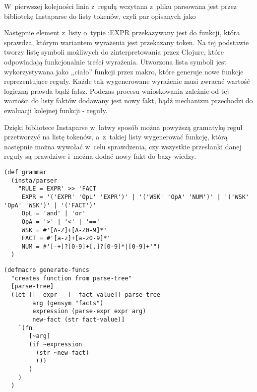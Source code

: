 W~pierwszej kolejności linia z~regułą wczytana z~pliku parsowana jest przez bibliotekę Instaparse\cite{instaparse} do listy tokenów, czyli par opisanych jako
\begin{figure}[h]
\end{figure}

Następnie element z~listy o~typie :EXPR przekazywany jest do funkcji, która sprawdza, którym wariantem wyrażenia jest przekazany token. Na tej podstawie tworzy listę symboli możliwych do zinterpretowania przez Clojure, które odpowiadają funkcjonalnie treści wyrażenia. Utworzona lista symboli jest wykorzystywana jako ,,ciało'' funkcji przez makro, które generuje nowe funkcje reprezentujące reguły. Każde tak wygenerowane wyrażenie musi zwracać wartość logiczną prawda bądź fałsz. Podczas procesu wnioskowania zależnie od tej wartości do listy faktów dodawany jest nowy fakt, bądź mechanizm przechodzi do ewaluacji kolejnej funkcji - reguły.

Dzięki bibliotece Instaparse\cite{instaparse} w~łatwy sposób można powyższą gramatykę reguł przetworzyć na listę tokenów, a~z~takiej listy wygenerować funkcję, którą następnie można wywołać w~celu sprawdzenia, czy wszystkie przesłanki danej reguły są prawdziwe i~można dodać nowy fakt do bazy wiedzy.

\begin{lstlisting}
(def grammar
  (insta/parser
    "RULE = EXPR' >> 'FACT
     EXPR = '('EXPR' 'OpL' 'EXPR')' | '('WSK' 'OpA' 'NUM')' | '('WSK' 'OpA' 'WSK')' | '('FACT')'
     OpL = 'and' | 'or'
     OpA = '>' | '<' | '=='
     WSK = #'[A-Z]+[A-Z0-9]*'
     FACT = #'[a-z]+[a-z0-9]*'
     NUM = #'[-+]?[0-9]+[.]?[0-9]*|[0-9]+'")
  )
\end{lstlisting}

\begin{lstlisting}
(defmacro generate-funcs 
  "creates function from parse-tree"
  [parse-tree]
  (let [[_ expr _ [_ fact-value]] parse-tree
        arg (gensym "facts")
        expression (parse-expr expr arg)
        new-fact (str fact-value)]
    `(fn 
       [~arg] 
       (if ~expression
         (str ~new-fact) 
         ())
       )
    )
  )
\end{lstlisting}

